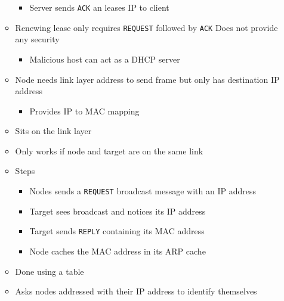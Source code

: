 \begin{itemize}
\begin{itemize}
\begin{itemize}
                     \item Server sends \verb+ACK+ an leases IP to client
                \end{itemize}
            \item Renewing lease only requires \verb+REQUEST+ followed by \verb+ACK+
            \icon Does not provide any security
                \begin{itemize}
                    \item Malicious host can act as a DHCP server
                \end{itemize}
        \end{itemize}
        \begin{itemize}
            \item Node needs link layer address to send frame but only has destination IP address
                \begin{itemize}
                    \item Provides IP to MAC mapping
                \end{itemize}
            \item Sits on the link layer
            \item Only works if node and target are on the same link
            \item Steps
                \begin{itemize}
                    \item Nodes sends a \verb+REQUEST+ broadcast message with an IP address
                    \item Target sees broadcast and notices its IP address
                    \item Target sends \verb+REPLY+ containing its MAC address
                    \item Node caches the MAC address in its ARP cache
                \end{itemize}
            \item Done using a table
            \item Asks nodes addressed with their IP address to identify themselves
        \end{itemize}
\end{itemize}


